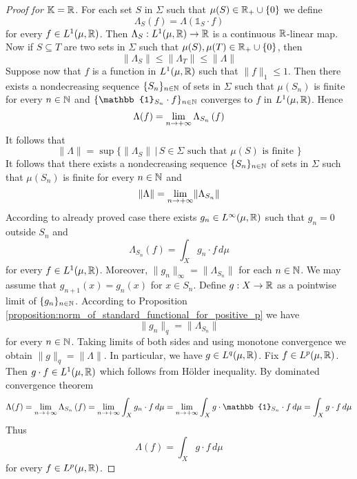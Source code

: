 \begin{proof}[Proof for $\mathbb{K}={\mathbb R}$]
For each set $S$ in $\Sigma$ such that $\mu(S) \in {\mathbb R}_+\cup \{0\}$ we define
$$\Lambda_S(f) = \Lambda\left(\mathbb{1}_S\cdot f\right)$$
for every $f \in L^1(\mu,{\mathbb R})$. Then $\Lambda_S:L^1(\mu,{\mathbb R})\rightarrow {\mathbb R}$ is a continuous ${\mathbb R}$-linear map. Now if $S\subseteq T$ are two sets in $\Sigma$ such that $\mu(S),\mu(T) \in {\mathbb R}_+\cup \{0\}$, then
$$\lVert \Lambda_S\rVert \leq \lVert \Lambda_T\rVert \leq \lVert \Lambda \rVert$$
Suppose now that $f$ is a function in $L^1(\mu, {\mathbb R})$ such that $\lVert f \rVert_1 \leq 1$. Then there exists a nondecreasing sequence $\{S_n\}_{n\in {\mathbb N}}$ of sets in $\Sigma$ such that $\mu(S_n)$ is finite for every $n\in {\mathbb N}$ and $\{\mathbb{1}_{S_n}\cdot f\}_{n\in \NN}$ converges to $f$ in $L^1(\mu, {\mathbb R})$. Hence 
$$\Lambda(f) = \lim_{n\rightarrow +\infty}\Lambda_{S_n}\left(f\right)$$
It follows that
$$\lVert \Lambda \rVert = \sup \big\{\lVert \Lambda_S \rVert\,\big|\,S\in \Sigma\mbox{ such that }\mu(S)\mbox{ is finite }\}$$
It follows that there exists a nondecreasing sequence $\{S_n\}_{n\in {\mathbb N}}$ of sets in $\Sigma$ such that $\mu(S_n)$ is finite for every $n\in {\mathbb N}$ and 
$$\lVert \Lambda \rVert = \lim_{n\rightarrow +\infty}\lVert \Lambda_{S_n} \rVert$$
According to already proved case there exists $g_n \in L^{\infty}(\mu,{\mathbb R})$ such that $g_n = 0$ outside $S_n$ and
$$\Lambda_{S_n}(f) = \int_X g_n\cdot f\,d\mu$$
for every $f\in L^1(\mu,{\mathbb R})$. Moreover, $\lVert g_n \rVert_{\infty} = \lVert \Lambda_{S_n}\rVert$ for each $n \in {\mathbb N}$. We may assume that $g_{n+1}(x) = g_n(x)$ for $x\in S_n$. Define $g:X\rightarrow {\mathbb R}$ as a pointwise limit of $\{g_n\}_{n\in {\mathbb N}}$. According to Proposition \ref{proposition:norm_of_standard_functional_for_positive_p} we have
$$\lVert g_n \rVert_{q} = \lVert \Lambda_{S_n} \rVert$$
for every $n \in {\mathbb N}$. Taking limits of both sides and using monotone convergence we obtain $\lVert g \rVert_{q} = \lVert \Lambda \rVert$. In particular, we have $g\in L^q(\mu, {\mathbb R})$. Fix $f \in L^p(\mu,{\mathbb R})$. Then $g\cdot f \in L^1(\mu,{\mathbb R})$ which follows from H{\"o}lder inequality. By dominated convergence theorem
$$\Lambda(f) = \lim_{n\ra +\infty}\Lambda_{S_n}\left(f\right) = \lim_{n\ra +\infty}\int_X g_n\cdot f\,d\mu = \lim_{n\ra +\infty} \int_X g\cdot \mathbb{1}_{S_n}\cdot f\,d\mu = \int_X g\cdot f\,d\mu$$
Thus
$$\Lambda(f) = \int_X g\cdot f\,d\mu$$
for every $f \in L^p(\mu, {\mathbb R})$.
\end{proof}
    

















